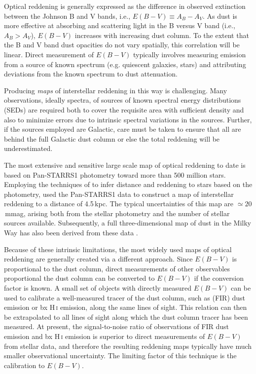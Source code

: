 \documentclass[iop,apj]{emulateapj}
\makeatletter
\def\testbx{bx}%
\DeclareRobustCommand{\ion}[2]{%
\relax\ifmmode
\ifx\testbx\f@series
{\mathbf{#1\,\mathsc{#2}}}\else
{\mathrm{#1\,\mathsc{#2}}}\fi
\else\textup{#1\,{\mdseries\textsc{#2}}}%
\fi}
\makeatother
\begin{document}
Optical reddening is generally expressed as the difference in observed extinction between the Johnson B and V bands, i.e., $E(B-V) \equiv A_B - A_V$. As dust is more effective at absorbing and scattering light in the B versus V band (i.e., $A_B > A_V$), $E(B-V)$ increases with increasing dust column. To the extent that the B and V band dust opacities do not vary spatially, this correlation will be linear. Direct measurement of $E(B-V)$ typically involves measuring emission from a source of known spectrum (e.g. quiescent galaxies, stars) and attributing deviations from the known spectrum to dust attenuation.

Producing {\it maps} of interstellar reddening in this way is challenging. Many observations, ideally spectra, of sources of known spectral energy distributions (SEDs) are required both to cover the requisite area with sufficient density and also to minimize errors due to intrinsic spectral variations in the sources. Further, if the sources employed are Galactic, care must be taken to ensure that all are behind the full Galactic dust column or else the total reddening will be underestimated. 

The most extensive and sensitive large scale map of optical reddening to date is based on Pan-STARRS1 photometry toward more than 500 million stars. Employing the techniques of \citet{Green+etal_2014} to infer distance and reddening to stars based on the photometry, \citet[][hereafter S14]{Schlafly+etal_2014} used the Pan-STARRS1 data to construct a map of interstellar reddening to a distance of 4.5\,kpc. The typical uncertainties of this map are $\simeq 20$\,mmag, arising both from the stellar photometry and the number of stellar sources available. Subsequently, a full three-dimensional map of dust in the Milky Way has also been derived from these data \citep{Green+etal_2015}.

Because of these intrinsic limitations, the most widely used maps of optical reddening are generally created via a different approach. Since $E(B-V)$ is proportional to the dust column, direct measurements of other observables proportional the dust column can be converted to $E(B-V)$ if the conversion factor is known. A small set of objects with directly measured $E(B-V)$ can be used to calibrate a well-measured tracer of the dust column, such as (FIR) dust emission or \ion{H}{i} emission, along the same lines of sight. This relation can then be extrapolated to all lines of sight along which the dust column tracer has been measured. At present, the signal-to-noise ratio of observations of FIR dust emission and \ion{H}{i} emission is superior to direct measurements of $E(B-V)$ from stellar data, and therefore the resulting reddening maps typically have much smaller observational uncertainty. The limiting factor of this technique is the calibration to $E(B-V)$.
\end{document}
